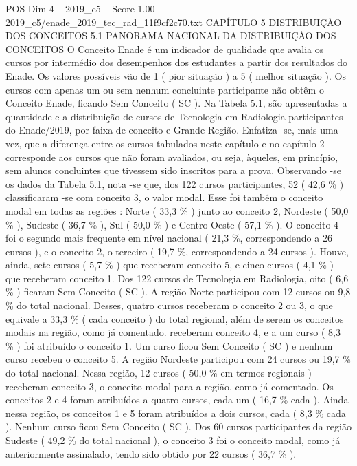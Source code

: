 \begin{textsample}{POS Dim 4 – 2019\_c5 – Score 1.00 – 2019\_c5/enade\_2019\_tec\_rad\_11f9cf2c70.txt}  \label{ex:f4_pos_197}
CAPÍTULO 5 DISTRIBUIÇÃO DOS CONCEITOS 5.1 PANORAMA NACIONAL DA DISTRIBUIÇÃO DOS CONCEITOS O Conceito Enade é um indicador de qualidade que avalia os cursos por intermédio dos desempenhos dos estudantes a partir dos resultados do Enade.
Os valores possíveis vão de 1 ( pior situação ) a 5 ( melhor situação ).
Os cursos com apenas um ou sem nenhum concluinte participante não obtêm o Conceito Enade, ficando Sem Conceito ( SC ).
Na Tabela 5.1, são apresentadas a quantidade e a distribuição de cursos de Tecnologia em Radiologia participantes do Enade/2019, por faixa de conceito e Grande Região.
Enfatiza -se, mais uma vez, que a diferença entre os cursos tabulados neste capítulo e no capítulo 2 corresponde aos cursos que não foram avaliados, ou seja, àqueles, em princípio, sem alunos concluintes que tivessem sido inscritos para a prova.
Observando -se os dados da Tabela 5.1, nota -se que, dos 122 cursos participantes, 52 ( 42,6 \% ) classificaram -se com conceito 3, o valor modal.
Esse foi também o conceito modal em todas as regiões : Norte ( 33,3 \% ) junto ao conceito 2, Nordeste ( 50,0 \% ), Sudeste ( 36,7 \% ), Sul ( 50,0 \% ) e Centro-Oeste ( 57,1 \% ).
O conceito 4 foi o segundo mais frequente em nível nacional ( 21,3 \%, correspondendo a 26 cursos ), e o conceito 2, o terceiro ( 19,7 \%, correspondendo a 24 cursos ).
Houve, ainda, sete cursos ( 5,7 \% ) que receberam conceito 5, e cinco cursos ( 4,1 \% ) que receberam conceito 1.
Dos 122 cursos de Tecnologia em Radiologia, oito ( 6,6 \% ) ficaram Sem Conceito ( SC ).
A região Norte participou com 12 cursos ou 9,8 \% do total nacional.
Desses, quatro cursos receberam o conceito 2 ou 3, o que equivale a 33,3 \% ( cada conceito ) do total regional, além de serem os conceitos modais na região, como já comentado. receberam conceito 4, e a um curso ( 8,3 \% ) foi atribuído o conceito 1.
Um curso ficou Sem Conceito ( SC ) e nenhum curso recebeu o conceito 5.
A região Nordeste participou com 24 cursos ou 19,7 \% do total nacional.
Nessa região, 12 cursos ( 50,0 \% em termos regionais ) receberam conceito 3, o conceito modal para a região, como já comentado.
Os conceitos 2 e 4 foram atribuídos a quatro cursos, cada um ( 16,7 \% cada ).
Ainda nessa região, os conceitos 1 e 5 foram atribuídos a dois cursos, cada ( 8,3 \% cada ).
Nenhum curso ficou Sem Conceito ( SC ).
Dos 60 cursos participantes da região Sudeste ( 49,2 \% do total nacional ), o conceito 3 foi o conceito modal, como já anteriormente assinalado, tendo sido obtido por 22 cursos ( 36,7 \% ).

\end{textsample}

